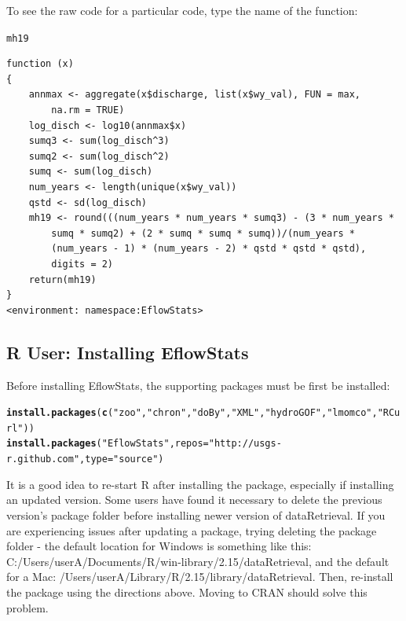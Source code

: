 \documentclass[a4paper,11pt]{article}\usepackage[]{graphicx}\usepackage[]{color}
\makeatletter
\newcommand{\hlstr}[1]{\textcolor[rgb]{0.192,0.494,0.8}{#1}}%
\newcommand{\hlstd}[1]{\textcolor[rgb]{0.345,0.345,0.345}{#1}}%
\newcommand{\hlkwc}[1]{\textcolor[rgb]{0.333,0.667,0.333}{#1}}%
\newcommand{\hlkwd}[1]{\textcolor[rgb]{0.737,0.353,0.396}{\textbf{#1}}}%
\newenvironment{kframe}{%
 \def\at@end@of@kframe{}%
 \ifinner\ifhmode%
  \def\at@end@of@kframe{\end{minipage}}%
  \begin{minipage}{\columnwidth}%
 \fi\fi%
 \def\FrameCommand##1{\hskip\@totalleftmargin \hskip-\fboxsep
 \colorbox{shadecolor}{##1}\hskip-\fboxsep
     \hskip-\linewidth \hskip-\@totalleftmargin \hskip\columnwidth}%
 \MakeFramed {\advance\hsize-\width
   \@totalleftmargin\z@ \linewidth\hsize
   \@setminipage}}%
 {\par\unskip\endMakeFramed%
 \at@end@of@kframe}
\newenvironment{knitrout}{}{} %
\makeatother
\begin{document}
To see the raw code for a particular code, type the name of the function:
\begin{knitrout}
\color{fgcolor}\begin{kframe}
\begin{alltt}
\hlstd{mh19}
\end{alltt}
\begin{verbatim}
function (x) 
{
    annmax <- aggregate(x$discharge, list(x$wy_val), FUN = max, 
        na.rm = TRUE)
    log_disch <- log10(annmax$x)
    sumq3 <- sum(log_disch^3)
    sumq2 <- sum(log_disch^2)
    sumq <- sum(log_disch)
    num_years <- length(unique(x$wy_val))
    qstd <- sd(log_disch)
    mh19 <- round(((num_years * num_years * sumq3) - (3 * num_years * 
        sumq * sumq2) + (2 * sumq * sumq * sumq))/(num_years * 
        (num_years - 1) * (num_years - 2) * qstd * qstd * qstd), 
        digits = 2)
    return(mh19)
}
<environment: namespace:EflowStats>
\end{verbatim}
\end{kframe}
\end{knitrout}


\FloatBarrier
\clearpage
\subsection{R User: Installing EflowStats}
Before installing EflowStats, the supporting packages must be first be installed:

\begin{knitrout}
\color{fgcolor}\begin{kframe}
\begin{alltt}
\hlkwd{install.packages}\hlstd{(}\hlkwd{c}\hlstd{(}\hlstr{"zoo"}\hlstd{,}\hlstr{"chron"}\hlstd{,}\hlstr{"doBy"}\hlstd{,}\hlstr{"XML"}\hlstd{,}\hlstr{"hydroGOF"}\hlstd{,}\hlstr{"lmomco"}\hlstd{,}\hlstr{"RCurl"}\hlstd{))}
\hlkwd{install.packages}\hlstd{(}\hlstr{"EflowStats"}\hlstd{,}\hlkwc{repos}\hlstd{=}\hlstr{"http://usgs-r.github.com"}\hlstd{,}\hlkwc{type}\hlstd{=}\hlstr{"source"}\hlstd{)}
\end{alltt}
\end{kframe}
\end{knitrout}


It is a good idea to re-start R after installing the package, especially if installing an updated version. Some users have found it necessary to delete the previous version's package folder before installing newer version of dataRetrieval. If you are experiencing issues after updating a package, trying deleting the package folder - the default location for Windows is something like this: C:/Users/userA/Documents/R/win-library/2.15/dataRetrieval, and the default for a Mac: 
/Users/userA/Library/R/2.15/library/dataRetrieval. Then, re-install the package using the directions above. Moving to CRAN should solve this problem.
\end{document}
